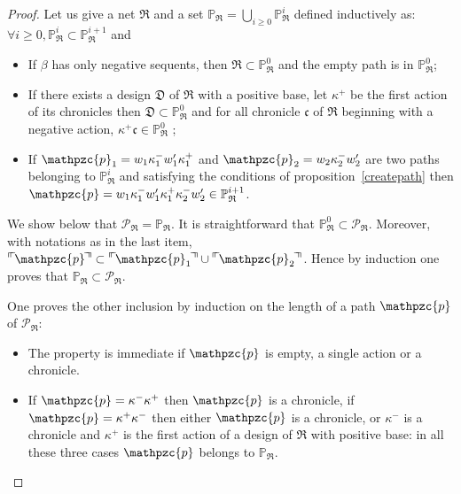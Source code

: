 \documentclass{LMCS}
\newcommand{\chronicle}[1]{{\mathfrak{#1}}}
\newcommand{\design}[1]{{\mathfrak{#1}}}
\newcommand{\pathLL}[1]{\mathpzc{#1}}\newcommand{\strategy}[1]{\pathLL{#1}}\newcommand{\view}[1]{\raisebox{.3ex}{$\ulcorner$}{#1}\raisebox{.3ex}{$\urcorner$}}\newcommand{\fullview}[1]{\raisebox{.3ex}{$\ulcorner\mkern-6mu\ulcorner\mkern-2mu$}{#1}\raisebox{.3ex}{$\mkern-2mu\urcorner\mkern-6mu\urcorner$}}\newcommand{\views}[1]{\view{#1}}\newcommand{\fullviews}[1]{\fullview{#1}}\newcommand{\shuffle}[1]{\llcorner\design{#1}\lrcorner}\newcommand{\PoD}[1]{{\mathcal{P}}_{#1}}\newcommand{\norm}[1]{\llbracket\design{#1}\rrbracket}
\begin{document}
\begin{proof}
Let us give a net $\design{R}$ and a set $\mathbb P_{\design{R}} =
\bigcup_{i\geq 0} \mathbb P^i_{\design{R}}$ defined inductively as:
$\forall i\geq 0, \mathbb P^i_{\design{R}} \subset \mathbb
P^{i+1}_{\design{R}}$ and
\begin{itemize}[label=$-$]
\item If $\beta$ has only negative sequents, then $\design{R} \subset \mathbb P^0_{\design{R}}$ and the empty path is in $\mathbb P^0_{\design{R}}$;
\item If there exists a design $\design{D}$ of $\design{R}$ with a positive base, 
let $\kappa^+$ be the first action of its chronicles 
then $\design{D} \subset \mathbb P^0_{\design{R}}$ and for all chronicle $\chronicle{c}$ of $\design{R}$ beginning with a negative action, $\kappa^+\chronicle{c}\in\mathbb P^0_{\design{R}}$ ;
\item If $\pathLL{p}_1=w_1\kappa_1^-w'_1\kappa^+_1$ and $\pathLL{p}_2=w_2\kappa_2^-w'_2$ are two paths belonging to $\mathbb P^i_{\design{R}}$ and satisfying the conditions of proposition~\ref{createpath} then
$\pathLL{p}=w_1\kappa_1^-w'_1\kappa_1^+\kappa_2^-w'_2\in\mathbb
  P^{i+1}_{\design{R}}$.
\end{itemize}

\noindent We show below that $\PoD{\design{R}} = \mathbb P_{\design{R}}$.
It is straightforward that $\mathbb P^0_{\design{R}} \subset
\PoD{\design{R}}$. Moreover, with notations as in the last item,
$\fullview{\pathLL{p}} \subset \fullview{\pathLL{p}_1} \cup
\fullview{\pathLL{p}_2}$. Hence by induction one proves that $\mathbb
P_{\design{R}} \subset \PoD{\design{R}}$.

One proves the other inclusion by induction on the length of a path
$\pathLL{p}$ of $\PoD{\design{R}}$:
\begin{itemize}[label=$-$]
 \item The property is immediate if $\pathLL{p}$ is empty, a single action or a chronicle.
 \item If $\pathLL{p} = \kappa^-\kappa^+$ then $\pathLL{p}$ is a
   chronicle, if $\pathLL{p} = \kappa^+\kappa^-$ then either
   $\pathLL{p}$ is a chronicle, or $\kappa^-$ is a chronicle and
   $\kappa^+$ is the first action of a design of $\design{R}$ with
   positive base: in all these three cases $\pathLL{p}$ belongs to
   $\mathbb P_{\design{R}}$.


\end{itemize}
\end{proof}
\end{document}
